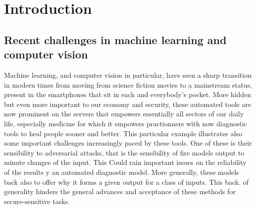 \documentclass[default]{sn-jnl}%
\theoremstyle{thmstyleone}%
\theoremstyle{thmstyletwo}%
\theoremstyle{thmstylethree}%
\begin{document}
\title[\ShortTitle]{\Title}
%
\author*{\fnm{\FirstAG} \sur{\LastAG}}\email{\EmailAG}
\author{\fnm{\FirstLP} \sur{\LastLP}}\email{\EmailLP}
\affil{\orgdiv{\Department}, \orgname{\Affiliation}\\ \orgaddress{\street{\Street}, \city{\City}, \postcode{\PostCode}, \country{\Country}}}


\abstract{
\Abstract
}

%
%
\keywords{\Keywords}
%
\maketitle
\section{Introduction}
\label{sec:intro}
%
\subsection{Recent challenges in machine learning and computer vision}
Machine learning, and computer vision in particular, have seen a sharp transition in modern times from moving from science fiction movies to a mainstream status, present in the smartphones that sit in each and everybody's pocket. More hidden but even more important to our economy and security, these automated tools are now prominent on the servers that empowers essentially all sectors of our daily life, especially medicine for which it empowers practionners with now diagnostic tools to heal people sooner and better. This particular example illustrates also some important challenges increasingly paced by these tools. One of these is their sensibility to adversarial attacks, that is the sensibility of fire models output to minute changes of the input. This Could rain important issues on the reliability of the results y an automated diagnostic model. More generally, these models back also to offer why it forms a given output for a class of inputs. This back. of generality hinders the general advances and acceptance of these methods for secure-sensitive tasks.
\end{document}
